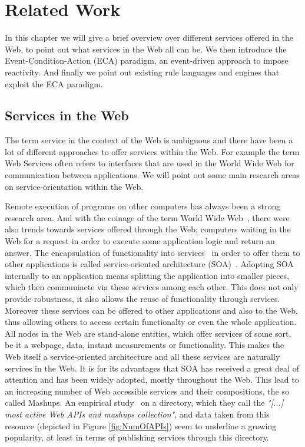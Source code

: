 
\chapter{Related Work}

In this chapter we will give a brief overview over different services offered in the Web, to point out what services in the Web all can be.
We then introduce the Event-Condition-Action (\textrm{ECA}) paradigm, an event-driven approach to impose reactivity.
And finally we point out existing rule languages and engines that exploit the \textrm{ECA} paradigm.



\section{Services in the Web}
The term service in the context of the Web is ambiguous and there have been a lot of different approaches to offer services within the Web.
For example the term \textrm{Web Services} often refers to interfaces that are used in the \textrm{World Wide Web} for communication between applications.
We will point out some main research areas on service-orientation within the Web.

Remote execution of programs on other computers has always been a strong research area. And with the coinage of the term \textrm{World Wide Web}~\cite{DBLP:journals/en/Berners-LeeCGP92}, there were also trends towards services offered through the Web; computers waiting in the Web for a request in order to execute some application logic and return an answer.
The encapsulation of functionality into services~\cite{peltz2003web} in order to offer them to other applications is called service-oriented architecture (\textrm{SOA})~\cite{perrey2003service}.
Adopting \textrm{SOA} internally to an application means splitting the application into smaller pieces, which then communiacte via these services among each other.
This does not only provide robustness, it also allows the reuse of functionality through services.
Moreover these services can be offered to other applications and also to the Web, thus allowing others to access certain functionalty or even the whole application.
All nodes in the Web are stand-alone entities, which offer services of some sort, be it a webpage, data, instant measurements or functionality.
This makes the Web itself a service-oriented architecture and all these services are naturally services in the Web.
It is for its advantages that \textrm{SOA} has received a great deal of attention and has been widely adopted, mostly throughout the Web.
This lead to an increasing number of Web accessible services and their compositions, the so called \textrm{Mashups}.
An empirical study~\cite{conf/icws/HuangFT12} on a directory, which they call the \textit{"[...] most active Web APIs and mashups collection"}, and data taken from this resource (depicted in Figure \ref{fig:NumOfAPIs}) seem to underline a growing popularity, at least in terms of publishing services through this directory.

